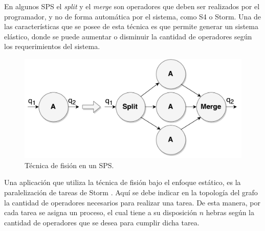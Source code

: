 En algunos SPS el \textit{split} y el \textit{merge} son operadores que deben ser realizados por el programador, y no de forma autom\'atica por el sistema, como S4 o Storm. Una de las caracter\'isticas que se posee de esta t\'ecnica es que permite generar un sistema el\'astico, donde se puede aumentar o disminuir la cantidad de operadores seg\'un los requerimientos del sistema.

\begin{figure}[!ht]
	\centering
	\includegraphics[scale=0.4]{images/Fision.pdf}
	\caption{T\'ecnica de fisi\'on en un SPS.}
	\label{fig:fision}
\end{figure}



Una aplicaci\'on que utiliza la t\'ecnica de fisi\'on bajo el enfoque est\'atico, es la paralelizaci\'on de tareas de Storm \citep{bookstorm}. Aqu\'i se debe indicar en la topolog\'ia del grafo la cantidad de operadores necesarios para realizar una tarea. De esta manera, por cada tarea se asigna un proceso, el cual tiene a su disposici\'on $n$ hebras seg\'un la cantidad de operadores que se desea para cumplir dicha tarea.

